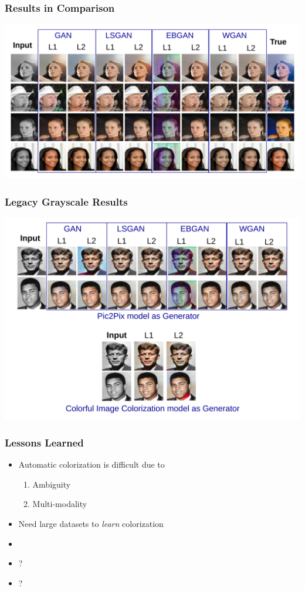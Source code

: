 \documentclass{beamer}
\begin{document}
\begin{frame}
\frametitle{\textbf{Results in Comparison}}
\centering
\includegraphics[width= \linewidth]{13.pdf}
\end{frame}

\begin{frame}
\frametitle{\textbf{Legacy Grayscale Results}}
\centering
\includegraphics[width= 0.95 \linewidth]{14.pdf}
\end{frame}

\begin{frame}
\frametitle{\textbf{Lessons Learned}}

\begin{itemize}
\item Automatic colorization is difficult due to
\begin{enumerate}[$-$]
\item Ambiguity
\item Multi-modality
\end{enumerate}
\item Need large datasets to \textit{learn} colorization
\item 
\item ?
\item ?
\end{itemize}
\end{frame}
\end{document}
